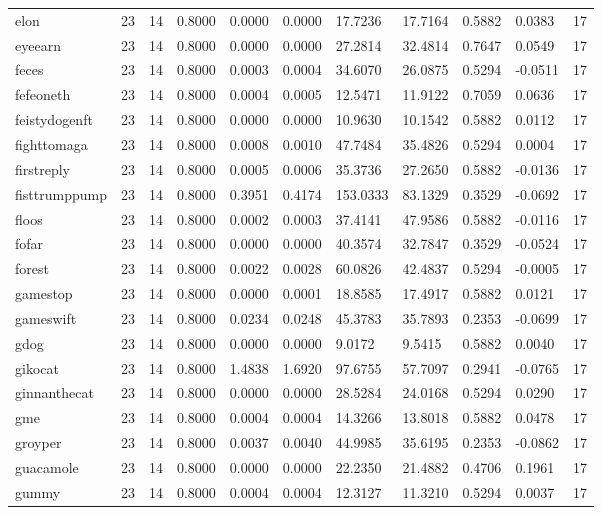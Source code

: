 \begin{table}[htbp]
\begin{tabular}{lllllllllll}
elon & 23 & 14 & 0.8000 & 0.0000 & 0.0000 & 17.7236 & 17.7164 & 0.5882 & 0.0383 & 17 \\
eyeearn & 23 & 14 & 0.8000 & 0.0000 & 0.0000 & 27.2814 & 32.4814 & 0.7647 & 0.0549 & 17 \\
feces & 23 & 14 & 0.8000 & 0.0003 & 0.0004 & 34.6070 & 26.0875 & 0.5294 & -0.0511 & 17 \\
fefeoneth & 23 & 14 & 0.8000 & 0.0004 & 0.0005 & 12.5471 & 11.9122 & 0.7059 & 0.0636 & 17 \\
feistydogenft & 23 & 14 & 0.8000 & 0.0000 & 0.0000 & 10.9630 & 10.1542 & 0.5882 & 0.0112 & 17 \\
fighttomaga & 23 & 14 & 0.8000 & 0.0008 & 0.0010 & 47.7484 & 35.4826 & 0.5294 & 0.0004 & 17 \\
firstreply & 23 & 14 & 0.8000 & 0.0005 & 0.0006 & 35.3736 & 27.2650 & 0.5882 & -0.0136 & 17 \\
fisttrumppump & 23 & 14 & 0.8000 & 0.3951 & 0.4174 & 153.0333 & 83.1329 & 0.3529 & -0.0692 & 17 \\
floos & 23 & 14 & 0.8000 & 0.0002 & 0.0003 & 37.4141 & 47.9586 & 0.5882 & -0.0116 & 17 \\
fofar & 23 & 14 & 0.8000 & 0.0000 & 0.0000 & 40.3574 & 32.7847 & 0.3529 & -0.0524 & 17 \\
forest & 23 & 14 & 0.8000 & 0.0022 & 0.0028 & 60.0826 & 42.4837 & 0.5294 & -0.0005 & 17 \\
gamestop & 23 & 14 & 0.8000 & 0.0000 & 0.0001 & 18.8585 & 17.4917 & 0.5882 & 0.0121 & 17 \\
gameswift & 23 & 14 & 0.8000 & 0.0234 & 0.0248 & 45.3783 & 35.7893 & 0.2353 & -0.0699 & 17 \\
gdog & 23 & 14 & 0.8000 & 0.0000 & 0.0000 & 9.0172 & 9.5415 & 0.5882 & 0.0040 & 17 \\
gikocat & 23 & 14 & 0.8000 & 1.4838 & 1.6920 & 97.6755 & 57.7097 & 0.2941 & -0.0765 & 17 \\
ginnanthecat & 23 & 14 & 0.8000 & 0.0000 & 0.0000 & 28.5284 & 24.0168 & 0.5294 & 0.0290 & 17 \\
gme & 23 & 14 & 0.8000 & 0.0004 & 0.0004 & 14.3266 & 13.8018 & 0.5882 & 0.0478 & 17 \\
groyper & 23 & 14 & 0.8000 & 0.0037 & 0.0040 & 44.9985 & 35.6195 & 0.2353 & -0.0862 & 17 \\
guacamole & 23 & 14 & 0.8000 & 0.0000 & 0.0000 & 22.2350 & 21.4882 & 0.4706 & 0.1961 & 17 \\
gummy & 23 & 14 & 0.8000 & 0.0004 & 0.0004 & 12.3127 & 11.3210 & 0.5294 & 0.0037 & 17 \\

\end{tabular}
\end{table}
